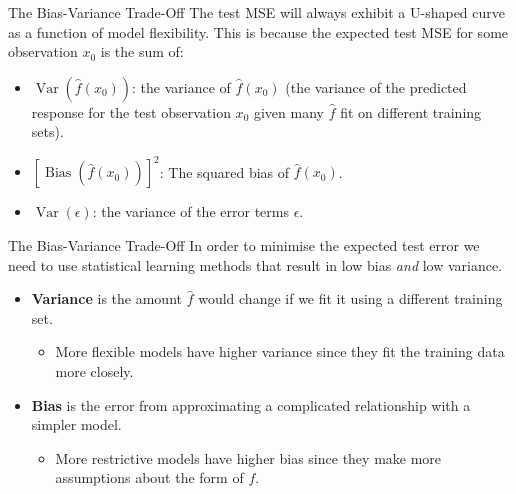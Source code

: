 \documentclass[
  ignorenonframetext,
  aspectratio=169,
]{beamer}
\providecommand{\tightlist}{%
  \setlength{\itemsep}{0pt}\setlength{\parskip}{0pt}}\usepackage{longtable,booktabs,array}
\begin{document}
\begin{frame}{The Bias-Variance Trade-Off}
\protect\hypertarget{the-bias-variance-trade-off}{}
The test MSE will always exhibit a U-shaped curve as a function of model
flexibility. This is because the expected test MSE for some observation
\(x_0\) is the sum of:

\begin{itemize}
\tightlist
\item
  \(\operatorname{Var}\left(\hat{f}\left(x_{0}\right)\right)\): the
  variance of \(\hat{f}\left(x_{0}\right)\) (the variance of the
  predicted response for the test observation \(x_0\) given many
  \(\hat{f}\) fit on different training sets).
\item
  \(\left[\operatorname{Bias}\left(\hat{f}\left(x_{0}\right)\right)\right]^{2}\):
  The squared bias of \(\hat{f}\left(x_{0}\right)\).
\item
  \(\operatorname{Var}(\epsilon)\): the variance of the error terms
  \(\epsilon\).
\end{itemize}
\end{frame}

\begin{frame}{The Bias-Variance Trade-Off}
\protect\hypertarget{the-bias-variance-trade-off-1}{}
\alert{In order to minimise the expected test error we need to use statistical learning methods that result in low bias \textit{and} low variance.}

\begin{itemize}
\tightlist
\item
  \textbf{Variance} is the amount \(\hat{f}\) would change if we fit it
  using a different training set.

  \begin{itemize}
  \tightlist
  \item
    More flexible models have higher variance since they fit the
    training data more closely.
  \end{itemize}
\item
  \textbf{Bias} is the error from approximating a complicated
  relationship with a simpler model.

  \begin{itemize}
  \tightlist
  \item
    More restrictive models have higher bias since they make more
    assumptions about the form of \(f\).
  \end{itemize}
\end{itemize}
\end{frame}
\end{document}
